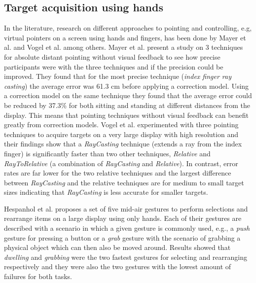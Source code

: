 \subsection{Target acquisition using hands} \label{sec:targetAcquisitionHands}
In the literature, research on different approaches to pointing and controlling, e.g, virtual pointers on a screen using hands and fingers, has been done by Mayer et al. \cite{Mayer:2015} and Vogel et al. \cite{Vogel:2005} among others.
Mayer et al. present a study on 3 techniques for absolute distant pointing without visual feedback to see how precise participants were with the three techniques and if the precision could be improved.
They found that for the most precise technique (\emph{index finger ray casting}) the average error was 61.3 cm before applying a correction model.
Using a correction model on the same technique they found that the average error could be reduced by 37.3\% for both sitting and standing at different distances from the display.
This means that pointing techniques without visual feedback can benefit greatly from correction models.
Vogel et al. experimented with three pointing techniques to acquire targets on a very large display with high resolution and their findings show that a \emph{RayCasting} technique (extends a ray from the index finger) is significantly faster than two other techniques, \emph{Relative} and \emph{RayToRelative} (a combination of \emph{RayCasting} and \emph{Relative}).
In contrast, error rates are far lower for the two relative techniques and the largest difference between \emph{RayCasting} and the relative techniques are for medium to small target sizes indicating that \emph{RayCasting} is less accurate for smaller targets.

Hespanhol et al. \cite{Hespanhol:2012} proposes a set of five mid-air gestures to perform selections and rearrange items on a large display using only hands.
Each of their gestures are described with a scenario in which a given gesture is commonly used, e.g., a \emph{push} gesture for pressing a button or a \emph{grab} gesture with the scenario of grabbing a physical object which can then also be moved around.
Results showed that \emph{dwelling} and \emph{grabbing} were the two fastest gestures for selecting and rearranging respectively and they were also the two gestures with the lowest amount of failures for both tasks.


